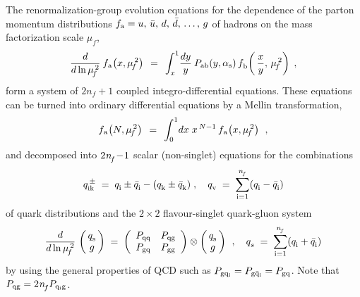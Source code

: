 \documentclass[12pt]{article}
\newcommand{\beq}{\begin{equation}}
\newcommand{\eeq}{\end{equation}}
\newcommand{\als}{\alpha_{\rm s}}
\newcommand{\mufs}{\mu_{\!\!\,f}^{\,2}}
\begin{document}
The renormalization-group evolution equations for the dependence of the 
parton momentum distributions $f_{\rm a} = u,\, \bar{u},\, d,\, \bar{d},\, 
\ldots,\, g$ of hadrons on the mass factorization scale $\mu_{\!f}^{}$,
%
\beq
\label{evol}
  \frac{d}{d \ln \mufs} \: f_{\:\!\rm a\!} \left(x,\mufs \right)
  \:\:=\:\: 
  \int_x^1 \! \frac{dy}{y} \: P_{\rm ab}(y,\als)\, 
    f_{\:\!\rm b}^{}\bigg( \,\frac{x}{y},\,\mufs \bigg)
  \:\: ,
\eeq
%
form a system of $2n_f\!+\!1$ coupled integro-differential equations.
These equations can be turned into ordinary differential equations by a 
Mellin transformation,
%
\beq
\label{Mtrf}
  f_{\:\!\rm a\!} \left(N,\mufs \right) 
  \:\:=\:\:
  \int_0^1 \!dx\; x^{\,N-1}\, f_{\:\!\rm a\!} \left(x,\mufs \right)
  \:\: ,
\eeq
%
and decomposed into $2\:\!{n^{}_{\! f}}\!-\!1$ scalar (non-singlet) equations for the
combinations
%
\beq
\label{qns}
   q^{\,\pm}_{\rm ik} \;=\; q_{\rm i}^{} \pm \bar{q}_{\rm i}^{} 
                      - ( q_{\rm k}^{} \pm \bar{q}_{\rm k}^{} )
\; , \quad
   q_{\rm v}^{} \;=\; \sum_{\rm i=1}^{\nf} ( q_{\rm i}^{} - \bar{q}_{\rm i}^{} )
\eeq
%
of quark distributions and the $2 \!\times\! 2$ flavour-singlet 
quark-gluon system
%
\beq
\label{Sevol}
  \frac{d}{d \ln \mufs}\,
  \left( \begin{array}{c} \!\! q_{\rm s}^{} \!\! \\ \! g\! \end{array} \right)
  \; = \; \left( \begin{array}{cc} P_{\rm qq} & P_{\rm qg} \\
  P_{\rm gq} & P_{\rm gg} \end{array} \right) \otimes
  \left( \begin{array}{c} \!\! q_{\rm s}^{} \!\! \\ \! g\! \end{array} \right)
  \:\: , \quad
  q_s^{} \;=\; \sum_{\rm i=1}^{\nf} ( q_{\rm i}^{} + \bar{q}_{\rm i}^{} )
\eeq
%
by using the general properties of QCD such as 
$P_{\rm gq_i} = P_{\rm g\bar{q}_i} = P_{\rm gq}$. 
Note that $P_{\rm qg} = 2\:\! {n^{}_{\! f}} P_{\rm q_ig}$.
\end{document}
